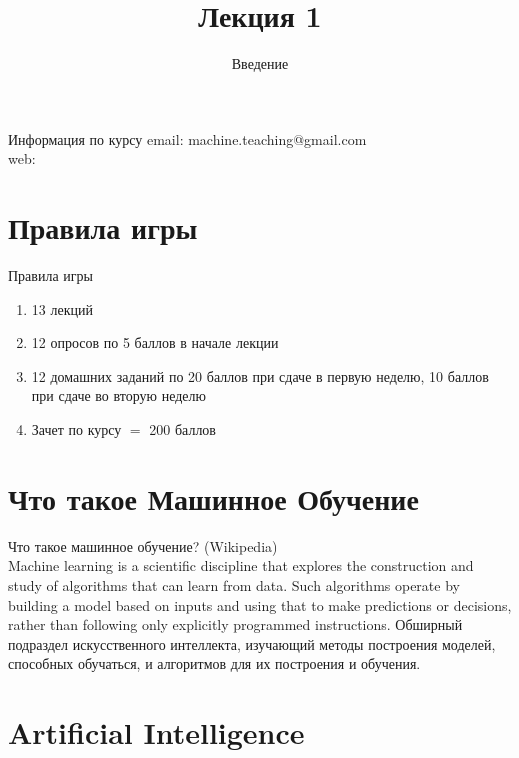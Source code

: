 \documentclass[10pt]{beamer}
\title{Лекция 1}
\subtitle{Введение}
\begin{document}
\maketitle

\begin{frame}{Информация по курсу}
  email: machine.teaching@gmail.com \\
  web: \\
\end{frame}

\section{Правила игры}

\begin{frame}{Правила игры}
  \begin{enumerate} [-]  
    \item 13 лекций
    \item 12 опросов по 5 баллов в начале лекции
    \item 12 домашних заданий по 20 баллов при сдаче в первую неделю, 10 баллов при сдаче во вторую неделю
    \bigbreak
    \item Зачет по курсу $=$ 200 баллов
  \end{enumerate}  
\end{frame}

\section{Что такое Машинное Обучение}

{
\begin{frame}{Что такое машинное обучение?}
  \alert{(Wikipedia)}\\
  Machine learning is a scientific discipline that explores the construction and study of algorithms that can learn from data. Such algorithms operate by building a model based on inputs and using that to make predictions or decisions, rather than following only explicitly programmed instructions. 
  \bigbreak
  Обширный подраздел искусственного интеллекта, изучающий методы построения моделей, способных обучаться, и алгоритмов для их построения и обучения.\\
\end{frame}
}

\section{Artificial Intelligence}
\end{document}
